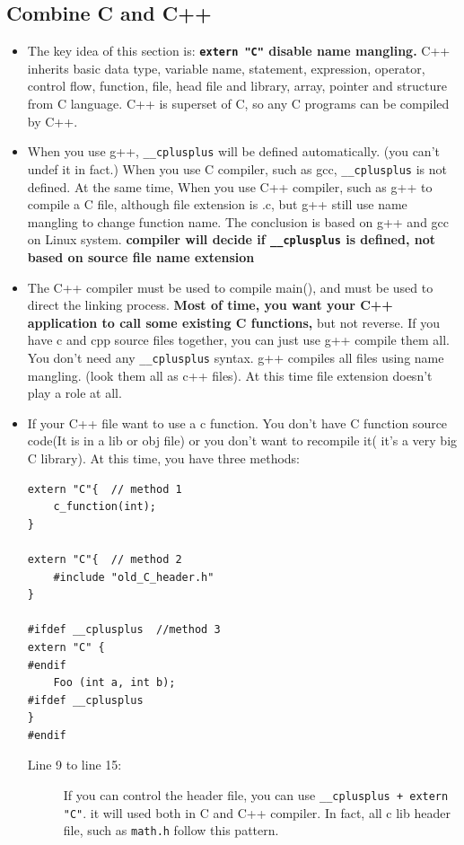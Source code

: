 \documentclass[a4paper,11pt,twoside]{book}
\begin{document}
\subsection{Combine C and C++}
\begin{itemize}
	
	\item The key idea of this section is: \textbf{\texttt{extern "C"} disable name mangling.} C++ inherits basic data type, variable name, statement, expression, operator, control flow, function, file, head file and library, array, pointer and structure from C language. C++ is superset of C, so any C programs can be compiled by C++.
        
    \item When you use g++,  \texttt{\_\_cplusplus} will be defined automatically. (you can't undef it in fact.) When you use C compiler, such as gcc, \texttt{\_\_cplusplus} is not defined. At the same time, When you use C++ compiler, such as g++ to compile a C file, although file extension is .c, but g++ still use name mangling to change function name.  The conclusion is based on g++ and gcc on Linux system. \textbf{compiler will decide if \texttt{\_\_cplusplus} is defined, not based on source file name extension}
	
	\item The C++ compiler must be used to compile main(), and must be used to direct the linking process. \textbf{Most of time, you want your C++ application to call some existing C functions,} but not reverse. If you have c and cpp source files together, you can just use g++ compile them all. You don't need any \texttt{\_\_cplusplus} syntax.  g++ compiles all files using name mangling. (look them all as c++ files). At this time file extension doesn't play a role at all.
	
	\item If your C++ file want to use a c function. You don't have C function source code(It is in a lib or obj file) or you don't want to recompile it( it's a very big C library). At this time, you have three methods:
	

\begin{lstlisting}
extern "C"{  // method 1
	c_function(int);
}
	
extern "C"{  // method 2
	#include "old_C_header.h"
}
	
#ifdef __cplusplus  //method 3
extern "C" {
#endif
	Foo (int a, int b);
#ifdef __cplusplus
}
#endif
\end{lstlisting}
	\begin{description}
	\item[Line 9 to line 15:] If you can control the header file, you can use \texttt{\_\_cplusplus + extern "C"}. it will used both in C and C++ compiler. In fact, all c lib header file, such as \texttt{math.h} follow this pattern.
\end{description}


\end{itemize}
\end{document}
